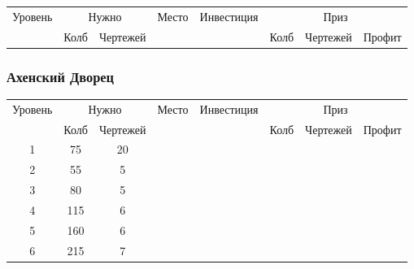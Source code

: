 \begin{longtable}[c]{|c|c|c|c|c|c|c|c|}
    \hline
    \multirow{ 2}{*}{\small Уровень} &
    \multicolumn{2}{|c|}{\small Нужно} &
    \multirow{ 2}{*}{\small Место} & 
    \multirow{ 2}{*}{\small Инвестиция} & 
    \multicolumn{3}{|c|}{\small Приз} \\\cline{2-3}\cline{6-8}
    &
    {\small Колб} & 
    {\small Чертежей} & 
    & &
    {\small Колб} & 
    {\small Чертежей} & 
    {\small Профит}
    \\\hline\endhead
\end{longtable}


\subsubsection{Ахенский Дворец}

\begin{longtable}[c]{|c|c|c|c|c|c|c|c|}
    \hline
    \multirow{ 2}{*}{\small Уровень} &
    \multicolumn{2}{|c|}{\small Нужно} &
    \multirow{ 2}{*}{\small Место} & 
    \multirow{ 2}{*}{\small Инвестиция} & 
    \multicolumn{3}{|c|}{\small Приз} \\\cline{2-3}\cline{6-8}
    &
    {\small Колб} & 
    {\small Чертежей} & 
    & &
    {\small Колб} & 
    {\small Чертежей} & 
    {\small Профит}
    \\\hline\endhead
    \multirow{1}{*}{1} & \multirow{1}{*}{75} & \multirow{1}{*}{20} & & & & & \\\hline
    \multirow{1}{*}{2} & \multirow{1}{*}{55} & \multirow{1}{*}{5} & & & & & \\\hline
    \multirow{1}{*}{3} & \multirow{1}{*}{80} & \multirow{1}{*}{5} & & & & & \\\hline
    \multirow{1}{*}{4} & \multirow{1}{*}{115} & \multirow{1}{*}{6} & & & & & \\\hline
    \multirow{1}{*}{5} & \multirow{1}{*}{160} & \multirow{1}{*}{6} & & & & & \\\hline
    \multirow{1}{*}{6} & \multirow{1}{*}{215} & \multirow{1}{*}{7} & & & & & \\\hline
\end{longtable}
